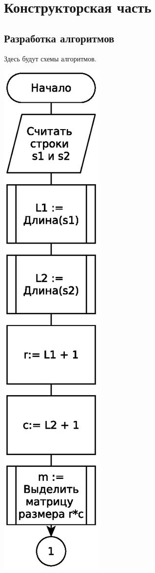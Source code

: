 \chapter{Конструкторская часть}
\label{cha:design}

\section{Разработка алгоритмов}
Здесь будут схемы алгоритмов.

\includegraphics[scale=0.75]{schemes/levenshtein-iterative-eps-1}

